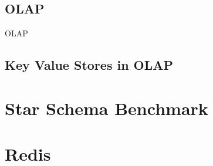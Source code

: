 \subsection{\acf{OLAP}}
\acf{OLAP}

















\subsection{Key Value Stores in OLAP}
\section{Star Schema Benchmark}
\section{Redis}